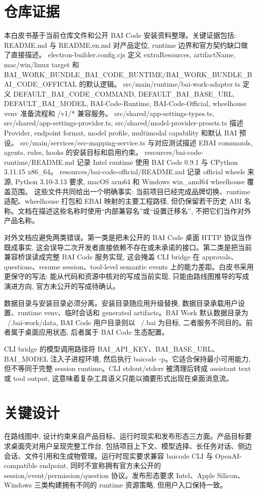 \section{仓库证据}
本白皮书基于当前仓库文件和公开 BAI Code 安装资料整理。关键证据包括: README.md 与 README.en.md 对产品定位, runtime 边界和官方契约缺口做了直接描述。 electron-builder.config.cjs 定义 extraResources, artifactName, mac/win/linux target 和 BAI\_WORK\_BUNDLE\_BAI\_CODE\_RUNTIME/BAI\_WORK\_BUNDLE\_BAI\_CODE\_OFFICIAL 的默认逻辑。 src/main/runtime/bai-work-adapter.ts 定义 DEFAULT\_BAI\_CODE\_COMMAND, DEFAULT\_BAI\_BASE\_URL, DEFAULT\_BAI\_MODEL, BAI-Code-Runtime, BAI-Code-Official, wheelhouse venv 准备流程和 /v1/* 兼容服务。 src/shared/app-settings-types.ts, src/shared/app-settings-provider.ts, src/shared/model-provider-presets.ts 描述 Provider, endpoint format, model profile, multimodal capability 和默认 BAI 预设。 src/main/services/ecc-mapping-service.ts 与对应测试描述 EBAI commands, agents, rules, hooks 的安装目标和启用约束。 resources/bai-code-runtime/README.md 记录 Intel runtime 使用 BAI Code 0.9.1 与 CPython 3.11.15 x86\_64。 resources/bai-code-official/README.md 记录 official wheels 来源, Python 3.10-3.13 要求, macOS arm64 和 Windows win\_amd64 wheelhouse 覆盖范围。 这些文件共同给出一个明确事实: 当前项目已经完成品牌切换、runtime 适配、wheelhouse 打包和 EBAI 映射的主要工程路径, 但仍保留若干历史 ABI 名称。文档在描述这些名称时使用“内部兼容名”或“设置迁移名”, 不把它们当作对外产品名称。

对外文档应避免两类错误。第一类是把未公开的 BAI Code 桌面 HTTP 协议当作既成事实, 这会误导二次开发者直接依赖不存在或未承诺的接口。第二类是把当前兼容桥误读成完整 BAI Code 服务实现, 这会掩盖 CLI bridge 在 approvals、questions、resume session、tool-level semantic events 上的能力差距。白皮书采用更保守的写法: 能从代码和资源中核对的写成当前实现, 只能由路线图推导的写成演进方向, 官方未公开的写成待确认。

数据目录与安装目录必须分离。安装目录随应用升级替换, 数据目录承载用户设置、runtime venv、临时会话和 generated artifacts。BAI Work 默认数据目录为 ~/.bai-work/data, BAI Code 用户目录则以 ~/.bai 为目标, 二者服务不同目的。前者属于桌面应用状态, 后者属于 BAI Code 生态配置。

CLI bridge 的模型调用路径将 BAI\_API\_KEY、BAI\_BASE\_URL、BAI\_MODEL 注入子进程环境, 然后执行 baicode -p。它适合保持最小可用能力, 但不等同于完整 session runtime。CLI stdout/stderr 被清理后转成 assistant text 或 tool output, 这意味着复杂工具语义只能以摘要形式出现在桌面消息流。

\section{关键设计}
在路线图中, 设计约束来自产品目标、运行时现实和发布形态三方面。产品目标要求桌面壳对用户呈现完整工作台, 包括项目上下文、模型选择、长任务对话、侧边会话、文件引用和生成物管理。运行时现实要求兼容 baicode CLI 与 OpenAI-compatible endpoint, 同时不宣称拥有官方未公开的 session/event/permission/question 协议。发布形态要求 Intel、Apple Silicon、Windows 三类构建拥有不同的 runtime 资源策略, 但用户入口保持一致。

